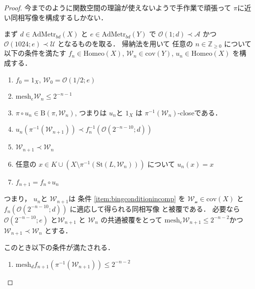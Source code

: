 \documentclass[leqno, a4paper, 12pt]{jsarticle}
\numberwithin{equation}{section}
\newcommand{\zz}{\mathbb{Z}}
\newcommand{\yocov}[1]{\mathrm{cov}(#1)}
\newcommand{\yocovfont}[1]{\mathscr{#1}}
\newcommand{\yofine}{\prec}
\newcommand{\yost}[1]{\mathrm{St}(#1)}
\newcommand{\yonbset}[2]{\mathrm{B}(#1, #2)}
\newcommand{\yocbamet}[1]{\mathrm{AdMetr}_{bd}(#1)}
\newcommand{\yoballfam}[2]{\yocovfont{O}(#1; #2)}
\newcommand{\yomaphset}[1]{\mathrm{Homeo}(#1)}
\newcommand{\yomesh}{\mathrm{mesh}}
\begin{document}
\begin{proof}
今までのように関数空間の理論が使えないようで手作業で頑張って
$\pi$に近い同相写像を構成するしかない．

まず
$d\in \yocbamet{X}$
と
$e\in \yocbamet{Y}$
で
$\yoballfam{1}{d}\yofine \yocovfont{A}$
かつ
$\yoballfam{1024}{e}\yofine \yocovfont{U}$
となるものを取る．
帰納法を用いて
任意の
$n\in \zz_{\ge 0}$
について以下の条件を満たす
$f_{n}\in \yomaphset{X}$, 
$\yocovfont{W}_{n}\in \yocov{Y}$, 
$u_{n}\in \yomaphset{X}$
を構成する．
\begin{enumerate}[label=\textup{(A\arabic*)}]
\item\label{item:A:shoki}
 $f_{0}=1_{X}$, 
$\yocovfont{W}_{0}=\yoballfam{1/2}{e}$


\item\label{item:A:mesh}
$\yomesh_{e}\yocovfont{W}_{n}\le 2^{-n-1}$

\item\label{item:A:piclose}
$\pi \circ u_{n}\in \yonbset{\pi}{\yocovfont{W}_{n}}$,
つまりは
$u_{n}$と
$1_{X}$
は
$\pi^{-1}(\yocovfont{W}_{n})$-closeである．



\item\label{item:A:shrink}
$u_{n}(\pi^{-1}(\yocovfont{W}_{n+1}))\yofine f_{n}^{-1}(\yoballfam{2^{-n-10}}{d})$

\item\label{item:A:refine}
$\yocovfont{W}_{n+1}\yofine \yocovfont{W}_{n}$


\item\label{item:A:identity}
任意の
$x\in K\cup (X\setminus \pi^{-1}(\yost{L, \yocovfont{W}_{n}}))$
について
$u_{n}(x)=x$


\item\label{item:A:deff}
$f_{n+1}=f_{n}\circ u_{n}$

\end{enumerate}
つまり，
$u_{n}$と
$\yocovfont{W}_{n+1}$は
条件
\ref{item:bingconditionincomp}
を
$\yocovfont{W_{n}}\in \yocov{X}$
と
$f_{n}(\yoballfam{2^{-n-10}}{d})$
に適応して得られる同相写像
と被覆である．
必要なら$\yoballfam{2^{-n-10}}{e}$
と$\yocovfont{W}_{n+1}$
と
$\yocovfont{W}_{n}$
の共通被覆をとって
$\yomesh_{e}\yocovfont{W}_{n+1}\le 2^{-n-2}$かつ
$\yocovfont{W}_{n+1}\yofine \yocovfont{W}_{n}$
とする．

このとき以下の条件が満たされる．
\begin{enumerate}[label=\textup{(B\arabic*)}]


\item\label{item:B:shrink}
$\yomesh_{d}{f_{n+1}(\pi^{-1}(\yocovfont{W}_{n+1}))}\le 2^{-n-2}$


\end{enumerate}
\end{proof}
\end{document}
